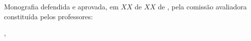 \documentclass[
	12pt,				%
	oneside,
	a4paper,			%
	english,			%
	brazil				%
	]{abntex2ufop} %
\begin{document}

%
% 
%
\begin{folhadeaprovacao}
% 
   Monografia defendida e aprovada, em $XX$ de $XX$ de \imprimirdata, pela comiss{\~a}o avaliadora constitu{\'i}da pelos professores:
   \vspace*{\fill}
   \vspace*{\fill}
   \vspace*{\fill}
   \vspace*{\fill}
      
   \begin{center}
    \vspace*{0.5cm}
    {\large\imprimirlocal}, {\large\imprimirdata}
    \vspace*{1cm}
  \end{center}
  
\end{folhadeaprovacao}


%
\end{document}
